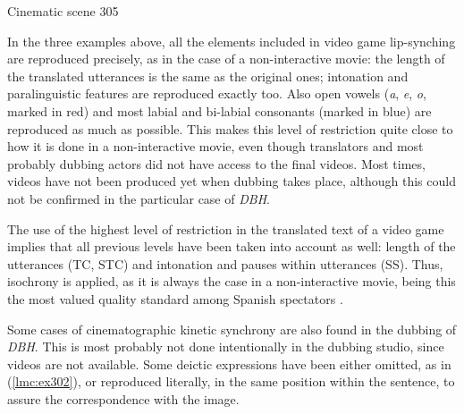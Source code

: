 \documentclass[output=paper]{langsci/langscibook}
\begin{document}
\begin{exe}
\ex Cinematic scene 305\label{lmc:ex305}

\end{exe}

In the three examples above, all the elements included in video game lip-syn\-ching are reproduced precisely, as in the case of a non-interactive movie: the length of the translated utterances is the same as the original ones; intonation and paralinguistic features are reproduced exactly too. Also open vowels (\textit{a}, \textit{e}, \textit{o}, marked in red) and most labial and bi-labial consonants (marked in blue) are reproduced as much as possible. This makes this level of restriction quite close to how it is done in a non-interactive movie, even though translators and most probably dubbing actors did not have access to the final videos. Most times, videos have not been produced yet when dubbing takes place, although this could not be confirmed in the particular case of \textit{DBH}.

The use of the highest level of restriction in the translated text of a video game implies that all previous levels have been taken into account as well: length of the utterances (TC, STC) and intonation and pauses within utterances (SS). Thus, isochrony is applied, as it is always the case in a non-interactive movie, being this the most valued quality standard among Spanish spectators \parencite{chaume07}.

Some cases of cinematographic kinetic synchrony are also found in the dubbing of \textit{DBH}. This is most probably not done intentionally in the dubbing studio, since videos are not available. Some deictic expressions have been either omitted, as in (\ref{lmc:ex302}), or reproduced literally, in the same position within the sentence, to assure the correspondence with the image.
\end{document}
